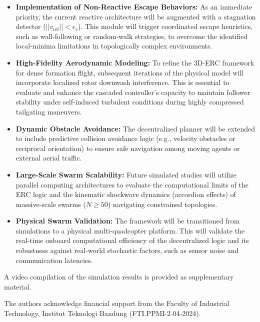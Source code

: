 \documentclass[pdflatex,sn-basic]{sn-jnl}%
\begin{document}
        \begin{itemize}
            \item \textbf{Implementation of Non-Reactive Escape Behaviors:} As an immediate priority, the current reactive architecture will be augmented with a stagnation detector ($||v_{\text{ref}}|| < \epsilon_v$). This module will trigger coordinated escape heuristics, such as wall-following or random-walk strategies, to overcome the identified local-minima limitations in topologically complex environments.
            
            \item \textbf{High-Fidelity Aerodynamic Modeling:} To refine the 3D-ERC framework for dense formation flight, subsequent iterations of the physical model will incorporate localized rotor downwash interference. This is essential to evaluate and enhance the cascaded controller's capacity to maintain follower stability under self-induced turbulent conditions during highly compressed tailgating maneuvers.
            
            \item \textbf{Dynamic Obstacle Avoidance:} The decentralized planner will be extended to include predictive collision avoidance logic (e.g., velocity obstacles or reciprocal orientation) to ensure safe navigation among moving agents or external aerial traffic.

            \item \textbf{Large-Scale Swarm Scalability:} Future simulated studies will utilize parallel computing architectures to evaluate the computational limits of the ERC logic and the kinematic shockwave dynamics (accordion effects) of massive-scale swarms ($N \ge 50$) navigating constrained topologies.
            
            \item \textbf{Physical Swarm Validation:} The framework will be transitioned from simulations to a physical multi-quadcopter platform. This will validate the real-time onboard computational efficiency of the decentralized logic and its robustness against real-world stochastic factors, such as sensor noise and communication latencies.
        \end{itemize}

\backmatter

A video compilation of the simulation results is provided as supplementary material.

The authors acknowledge financial support from the Faculty of Industrial Technology, Institut Teknologi Bandung (FTI.PPMI-2-04-2024).
\end{document}
